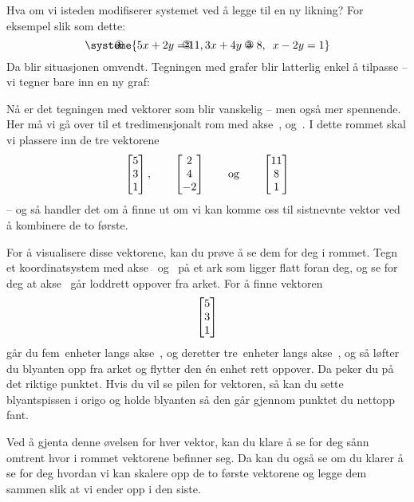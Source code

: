 Hva om vi isteden modifiserer systemet ved å legge til en ny likning?
For eksempel slik som dette:
\[
\systeme{
\makebox[0pt][l]{\hspace{-2em}\En}  5x + 2y = 11,
\makebox[0pt][l]{\hspace{-2em}\To}  3x + 4y = 8,
\makebox[0pt][l]{\hspace{-2em}\Tre} \phantom{3}x - 2y = 1
}
\]
Da blir situasjonen omvendt.  Tegningen med grafer blir latterlig
enkel å tilpasse -- vi tegner bare inn en ny graf:
\begin{center}
\end{center}
Nå er det tegningen med vektorer som blir vanskelig -- men også mer
spennende.  Her må vi gå over til et tredimensjonalt rom med akse~\En,
\To{} og~\Tre.  I dette rommet skal vi plassere inn de tre vektorene
\[
\begin{bmatrix} 5 \\ 3 \\ 1 \end{bmatrix},\qquad
\begin{bmatrix} 2 \\ 4 \\ -2 \end{bmatrix}\qquad\text{og}\qquad
\begin{bmatrix} 11 \\ 8 \\ 1 \end{bmatrix}
\]
-- og så handler det om å finne ut om vi kan komme oss til sistnevnte
vektor ved å kombinere de to første.

For å visualisere disse vektorene, kan du prøve å se dem for deg i
rommet.  Tegn et koordinatsystem med akse~\En{} og~\To{} på et ark som
ligger flatt foran deg, og se for deg at akse~\Tre{} går loddrett
oppover fra arket.  For å finne vektoren
\[
\begin{bmatrix} 5 \\ 3 \\ 1 \end{bmatrix}
\]
går du fem~enheter langs akse~\En, og deretter tre~enheter langs
akse~\To, og så løfter du blyanten opp fra arket og flytter den én
enhet rett oppover.  Da peker du på det riktige punktet.  Hvis du vil
se pilen for vektoren, så kan du sette blyantspissen i origo og holde
blyanten så den går gjennom punktet du nettopp fant.

Ved å gjenta denne øvelsen for hver vektor, kan du klare å se for deg
sånn omtrent hvor i rommet vektorene befinner seg.  Da kan du også se
om du klarer å se for deg hvordan vi kan skalere opp de to første
vektorene og legge dem sammen slik at vi ender opp i den siste.

